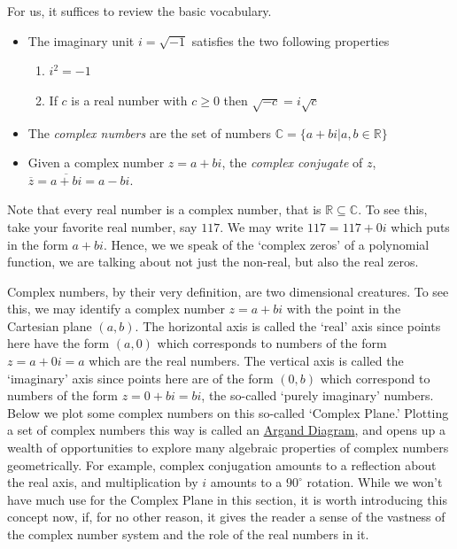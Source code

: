 \documentclass{ximera}
\begin{document}
For us, it suffices to review the basic vocabulary.

\begin{definition}  
    \begin{itemize}
         \item The imaginary unit $i = \sqrt{-1}$ satisfies the two following properties
        \begin{enumerate}
            \item  $i^2 = -1$
            \item  If $c$ is a real number with $c \geq 0$ then $\sqrt{-c} = i \sqrt{c}$
        \end{enumerate}
        \item The \emph{complex numbers} are the set of numbers $\mathbb{C} = \{ a + bi  |  a, b \in \mathbb{R} \}$
        \item  Given a complex number $z = a+bi$, the \emph{complex conjugate} of $z$, $\overline{z}  = \overline{a+bi} = a - bi$.
    \end{itemize}
\end{definition}

Note that every real number is a complex number, that is $\mathbb{R} \subseteq \mathbb{C}$.  To see this, take your favorite real number, say $117$.  We may write $117 = 117 + 0 i$ which puts in the form $a + bi$.  Hence, we we speak of the `complex zeros' of a polynomial function, we are talking about not just the non-real, but also the real zeros.

Complex numbers, by their very definition, are two dimensional creatures.  To see this, we may identify a complex number $z = a+bi$ with the point in the Cartesian plane $(a,b)$. The horizontal axis is called the `real' axis since points here have the form $(a,0)$ which corresponds to numbers of the form $z = a + 0i = a$ which are the real numbers. The vertical axis is called the `imaginary' axis since points here are of the form $(0,b)$ which correspond to numbers of the form $z = 0+bi = bi$,  the so-called `purely imaginary' numbers.  Below we plot some complex numbers on this so-called  `Complex Plane.'  Plotting a set of complex numbers this way is called an \href{https://en.wikipedia.org/wiki/Complex_plane}{Argand Diagram}, and opens up a wealth of opportunities to explore many algebraic properties of complex numbers geometrically. For example, complex conjugation amounts to a reflection about the real axis, and multiplication by $i$ amounts to a $90^{\circ}$ rotation. While we won't have much use for the Complex Plane in this section, it is worth introducing this concept now, if, for no other reason, it gives the reader a sense of the vastness of the complex number system and the role of the real numbers in it.
\end{document}

